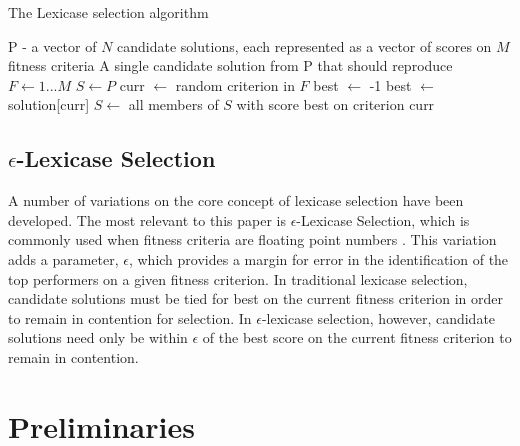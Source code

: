 \documentclass[sigconf]{acmart}
\begin{document}
\begin{algorithm}
\caption{The Lexicase selection algorithm}\label{alg:cap}
\begin{algorithmic}
\Require P - a vector of $N$ candidate solutions, each represented as a vector of scores on $M$ fitness criteria 
\Ensure A single candidate solution from P that should reproduce
\State $F \gets 1...M$ 
\State $S \gets P$ 
\State curr $\gets$ random criterion in $F$
\State best $\gets$ -1 
\State best $\gets$ solution[curr]
\EndIf
\EndFor
\State $S \gets$ all members of $S$ with score best on criterion curr
\EndWhile

\hspace{-2em}
\end{algorithmic}
\end{algorithm}

\subsection{\texorpdfstring{$\epsilon$-L} Lexicase Selection}

A number of variations on the core concept of lexicase selection have been developed. The most relevant to this paper is $\epsilon$-Lexicase Selection, which is commonly used when fitness criteria are floating point numbers \citep{la_cava_epsilon-lexicase_2016}. This variation adds a parameter, $\epsilon$, which provides a margin for error in the identification of the top performers on a given fitness criterion. In traditional lexicase selection, candidate solutions must be tied for best on the current fitness criterion in order to remain in contention for selection. In $\epsilon$-lexicase selection, however, candidate solutions need only be within $\epsilon$ of the best score on the current fitness criterion to remain in contention.



\section{Preliminaries}
\end{document}
